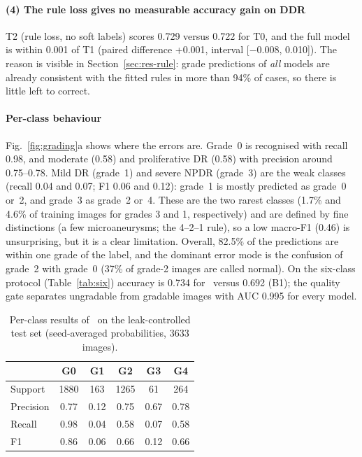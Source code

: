 \paragraph{(4) The rule loss gives no measurable accuracy gain on DDR} T2 (rule loss, no soft labels) scores 0.729 versus 0.722 for T0, and the full model is within 0.001 of T1 (paired difference +0.001, interval [$-$0.008, 0.010]). The reason is visible in Section~\ref{sec:res-rule}: grade predictions of \emph{all} models are already consistent with the fitted rules in more than 94\% of cases, so there is little left to correct.

\paragraph{Per-class behaviour} Fig.~\ref{fig:grading}a shows where the errors are. Grade~0 is recognised with recall 0.98, and moderate (0.58) and proliferative DR (0.58) with precision around 0.75--0.78. Mild DR (grade~1) and severe NPDR (grade~3) are the weak classes (recall 0.04 and 0.07; F1 0.06 and 0.12): grade~1 is mostly predicted as grade~0 or~2, and grade~3 as grade~2 or~4. These are the two rarest classes (1.7\% and 4.6\% of training images for grades 3 and 1, respectively) and are defined by fine distinctions (a few microaneurysms; the 4--2--1 rule), so a low macro-F1 (\num{0.46}) is unsurprising, but it is a clear limitation. Overall, 82.5\% of the predictions are within one grade of the label, and the dominant error mode is the confusion of grade~2 with grade~0 (37\% of grade-2 images are called normal). On the six-class protocol (Table~\ref{tab:six}) accuracy is 0.734 for \mname\ versus 0.692 (B1); the quality gate separates ungradable from gradable images with AUC 0.995 for every model.

\begin{table}[!htbp]
\centering
\caption{Per-class results of \mname\ on the leak-controlled test set (seed-averaged probabilities, 3633 images).}
\label{tab:perclass}
\small
\begin{tabular}{@{}lccccc@{}}
\toprule
 & G0 & G1 & G2 & G3 & G4 \\
\midrule
Support & 1880 & 163 & 1265 & 61 & 264 \\
Precision & 0.77 & 0.12 & 0.75 & 0.67 & 0.78 \\
Recall & 0.98 & 0.04 & 0.58 & 0.07 & 0.58 \\
F1 & 0.86 & 0.06 & 0.66 & 0.12 & 0.66 \\
\bottomrule
\end{tabular}
\end{table}

